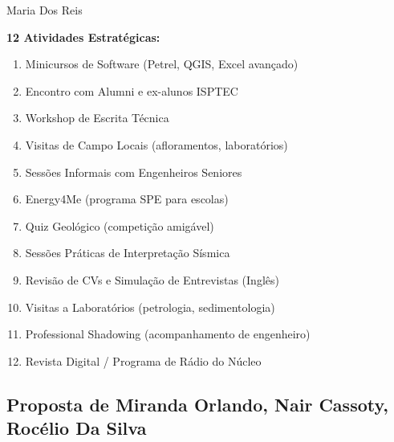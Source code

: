 \documentclass[12pt,a4paper,oneside]{article}
\begin{document}
\begin{proposalbox}{Maria Dos Reis}

\textbf{12 Atividades Estratégicas:}

\begin{enumerate}
  \item Minicursos de Software (Petrel, QGIS, Excel avançado)
  \item Encontro com Alumni e ex-alunos ISPTEC
  \item Workshop de Escrita Técnica
  \item Visitas de Campo Locais (afloramentos, laboratórios)
  \item Sessões Informais com Engenheiros Seniores
  \item Energy4Me (programa SPE para escolas)
  \item Quiz Geológico (competição amigável)
  \item Sessões Práticas de Interpretação Sísmica
  \item Revisão de CVs e Simulação de Entrevistas (Inglês)
  \item Visitas a Laboratórios (petrologia, sedimentologia)
  \item Professional Shadowing (acompanhamento de engenheiro)
  \item Revista Digital / Programa de Rádio do Núcleo
\end{enumerate}

\end{proposalbox}

\vspace{1.2cm}

\subsection{Proposta de Miranda Orlando, Nair Cassoty, Rocélio Da Silva}
\end{document}
